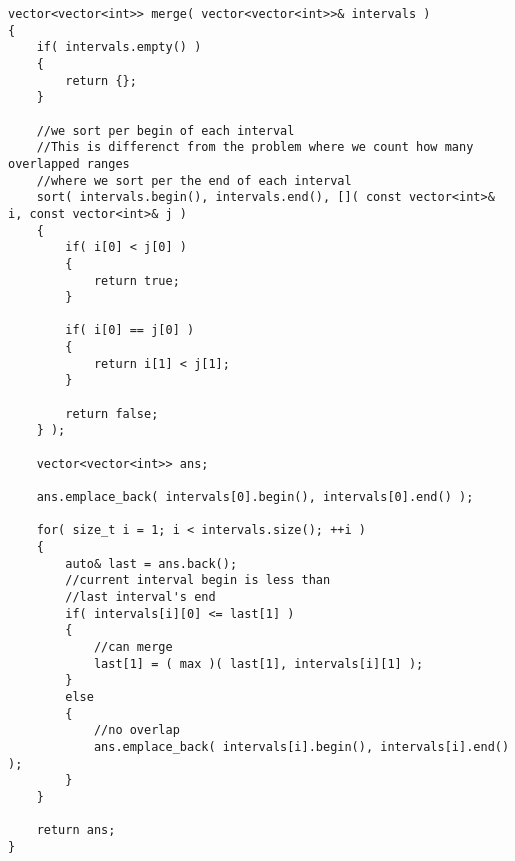 \setcounter{lstlisting}{0}
\begin{lstlisting}[style=customc, caption={Sort}]
vector<vector<int>> merge( vector<vector<int>>& intervals )
{
    if( intervals.empty() )
    {
        return {};
    }

    //we sort per begin of each interval
    //This is differenct from the problem where we count how many overlapped ranges
    //where we sort per the end of each interval
    sort( intervals.begin(), intervals.end(), []( const vector<int>& i, const vector<int>& j )
    {
        if( i[0] < j[0] )
        {
            return true;
        }

        if( i[0] == j[0] )
        {
            return i[1] < j[1];
        }

        return false;
    } );

    vector<vector<int>> ans;

    ans.emplace_back( intervals[0].begin(), intervals[0].end() );

    for( size_t i = 1; i < intervals.size(); ++i )
    {
        auto& last = ans.back();
        //current interval begin is less than
        //last interval's end
        if( intervals[i][0] <= last[1] )
        {
            //can merge
            last[1] = ( max )( last[1], intervals[i][1] );
        }
        else
        {
            //no overlap
            ans.emplace_back( intervals[i].begin(), intervals[i].end() );
        }
    }

    return ans;
}
\end{lstlisting}